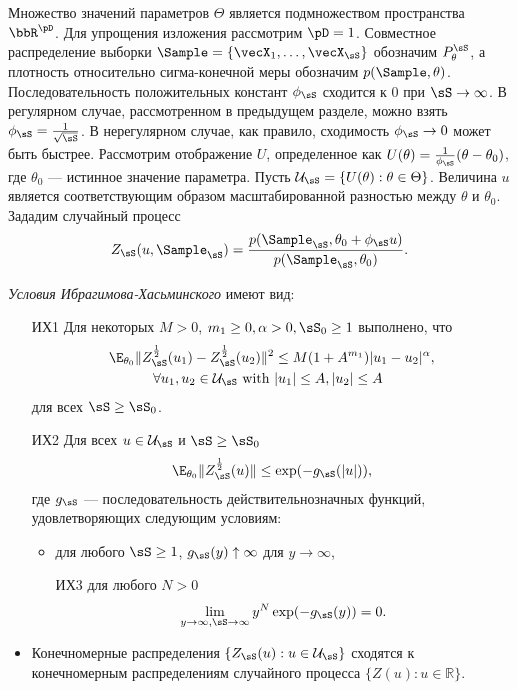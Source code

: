 Множество значений параметров $\Theta$ является подмножеством пространства $\bbR^{\pD}$.
Для упрощения изложения рассмотрим $\pD = 1$.
Совместное распределение выборки $\Sample = \{\vecX_1, \ldots, \vecX_{\sS}\}$ обозначим $P_{\theta}^{\sS}$, а плотность относительно сигма-конечной меры обозначим $p(\Sample, \theta)$.
Последовательность положительных констант $\phi_{\sS}$ сходится к $0$ при $\sS \rightarrow \infty$.
В регулярном случае, рассмотренном в предыдущем разделе, можно взять $\phi_{\sS} = \frac{1}{\sqrt{\sS}}$.
В нерегулярном случае, как правило, сходимость $\phi_{\sS} \rightarrow 0$ может быть быстрее.
Рассмотрим отображение $U$, определенное как $U(\theta) = \frac{1}{\phi_{\sS}} (\theta - \theta_0)$, где $\theta_0$ --- истинное значение параметра.
Пусть $\mathcal{U}_{\sS} = \{U(\theta): \theta \in \Theta \}$.
Величина $u$ является соответствующим образом масштабированной разностью между $\theta$ и $\theta_0$.
Зададим случайный процесс
\[
Z_{\sS}(u, \Sample_{\sS}) = \frac{p(\Sample_{\sS}, \theta_0 + \phi_{\sS} u)}{p(\Sample_{\sS}, \theta_0)}.
\]

\textit{Условия Ибрагимова-Хасьминского} имеют вид:
\begin{itemize}
\item[ИХ1] Для некоторых $M > 0$, $m_1 \geq 0, \alpha > 0, \sS_0 \geq 1$ выполнено, что
\begin{align*}
\E_{\theta_0} \| Z_{\sS}^{\frac12}(u_1) - Z_{\sS}^{\frac12}(u_2)\|^2 &\leq M (1 + A^{m_1}) |u_1 - u_2|^{\alpha}, \\
\forall u_1, u_2 \in \mathcal{U}_{\sS} \text{ with } &|u_1| \leq A, |u_2| \leq A
\end{align*}
для всех $\sS \geq \sS_0$.
\item[ИХ2] Для всех $u \in \mathcal{U}_{\sS}$ и $\sS \geq \sS_0$ 
\[
\E_{\theta_0} \|Z_{\sS}^{\frac12} (u) \| \leq \exp (-g_{\sS}(|u|)),
\]
где $g_{\sS}$ --- последовательность действительнозначных функций, удовлетворяющих следующим условиям:
\begin{itemize}
\item для любого $\sS \geq 1$, $g_{\sS}(y) \uparrow \infty$ для $y \rightarrow \infty$,
\item[ИХ3] для любого $N > 0$
\[
\lim_{y \rightarrow \infty, \\ \sS \rightarrow \infty} y^N \exp(-g_{\sS}(y)) = 0.
\]
\end{itemize}
\item Конечномерные распределения $\{Z_{\sS}(u): u \in \mathcal{U}_{\sS}\}$ сходятся к конечномерным распределениям случайного процесса $\{Z(u): u \in \mathbb{R}\}$.
\end{itemize}

